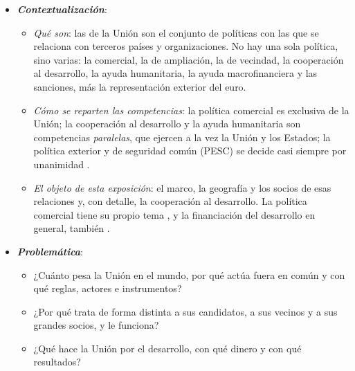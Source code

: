 \documentclass[11pt]{article}
\begin{document}
\begin{itemize}
\item \textbf{\emph{Contextualización}}:
  \begin{itemize}
  \item \emph{Qué son}: las  de la Unión son el conjunto de políticas con las que se relaciona con terceros países y organizaciones. No hay una sola política, sino varias: la comercial, la de ampliación, la de vecindad, la cooperación al desarrollo, la ayuda humanitaria, la ayuda macrofinanciera y las sanciones, más la representación exterior del euro.
  \item \emph{Cómo se reparten las competencias}: la política comercial es exclusiva de la Unión; la cooperación al desarrollo y la ayuda humanitaria son competencias \emph{paralelas}, que ejercen a la vez la Unión y los Estados; la política exterior y de seguridad común (PESC) se decide casi siempre por unanimidad .
  \item \emph{El objeto de esta exposición}: el marco, la geografía y los socios de esas relaciones y, con detalle, la cooperación al desarrollo. La política comercial tiene su propio tema , y la financiación del desarrollo en general, también .
  \end{itemize}

\item \textbf{\emph{Problemática}}:
  \begin{itemize}
  \item ¿Cuánto pesa la Unión en el mundo, por qué actúa fuera en común y con qué reglas, actores e instrumentos?
  \item ¿Por qué trata de forma distinta a sus candidatos, a sus vecinos y a sus grandes socios, y le funciona?
  \item ¿Qué hace la Unión por el desarrollo, con qué dinero y con qué resultados?
  \end{itemize}


\end{itemize}
\end{document}
